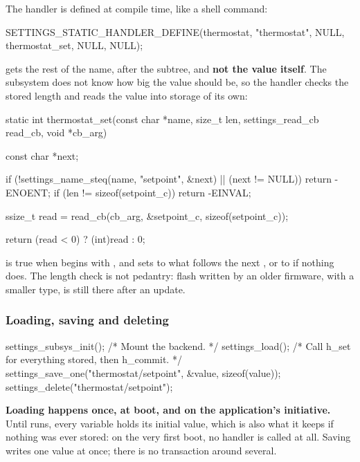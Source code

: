 The handler is defined at compile time, like a shell command:

\begin{ccode}
SETTINGS_STATIC_HANDLER_DEFINE(thermostat, "thermostat", NULL, thermostat_set, NULL, NULL);
\end{ccode}

\noindent {} gets the rest of the name, after the subtree, and \textbf{not the value
itself}. The subsystem does not know how big the value should be, so the handler checks the stored
length and reads the value into storage of its own:

\begin{ccode}
static int thermostat_set(const char *name, size_t len, settings_read_cb read_cb, void *cb_arg)
{
	const char *next;

	if (!settings_name_steq(name, "setpoint", &next) || (next != NULL)) {
		return -ENOENT;
	}
	if (len != sizeof(setpoint_c)) {
		return -EINVAL;
	}

	ssize_t read = read_cb(cb_arg, &setpoint_c, sizeof(setpoint_c));

	return (read < 0) ? (int)read : 0;
}
\end{ccode}

\noindent {} is true when  begins with
, and sets  to what follows the next \code{/}, or to  if
nothing does. The length check is not pedantry: flash written by an older firmware, with a smaller
type, is still there after an update.

\subsubsection{Loading, saving and deleting}
\begin{ccode}
settings_subsys_init();                       /* Mount the backend. */
settings_load();                              /* Call h_set for everything stored, then h_commit. */
settings_save_one("thermostat/setpoint", &value, sizeof(value));
settings_delete("thermostat/setpoint");
\end{ccode}

\textbf{Loading happens once, at boot, and on the application’s initiative.} Until
 runs, every variable holds its initial value, which is also what it keeps if
nothing was ever stored: on the very first boot, no handler is called at all. Saving writes one
value at once; there is no transaction around several.


